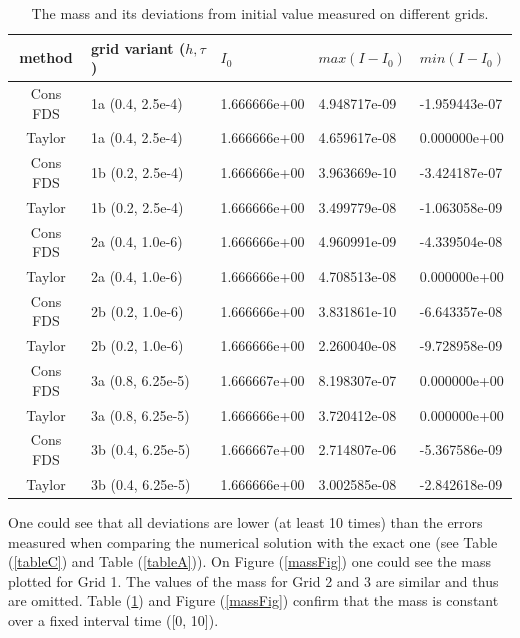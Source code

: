 \documentclass[%
 aip,
cp,  
 amsmath,amssymb,
 reprint,
]{iopconfser}
\newcommand{\rf}[1]{(\ref{#1})}
\begin{document}
\begin{table}[ht]
\centering
\small
		\begin{tabular}{||c|l|l|l|l||}
			\hline
method        & grid variant ($h,\tau$)& $I_0$ &   $max(I-I_0)$ & $min(I-I_0)$  \\
   			\hline 
Cons FDS            &  1a (0.4, 2.5e-4) & 1.666666e+00 &  4.948717e-09 & -1.959443e-07                    \\
 Taylor               &  1a (0.4, 2.5e-4) & 1.666666e+00 &  4.659617e-08 & 0.000000e+00                \\
Cons FDS            &  1b (0.2, 2.5e-4) & 1.666666e+00 & 3.963669e-10 & -3.424187e-07             \\
 Taylor               &  1b (0.2, 2.5e-4) & 1.666666e+00 & 3.499779e-08 & -1.063058e-09               \\
	   		\hline
			\hline
Cons FDS             & 2a (0.4, 1.0e-6) & 1.666666e+00 & 4.960991e-09 & -4.339504e-08                    \\
 Taylor                & 2a (0.4, 1.0e-6) & 1.666666e+00 & 4.708513e-08 & 0.000000e+00                   \\
Cons FDS            & 2b (0.2, 1.0e-6) & 1.666666e+00 & 3.831861e-10 & -6.643357e-08                  \\
 Taylor                & 2b (0.2, 1.0e-6) & 1.666666e+00 & 2.260040e-08 & -9.728958e-09                      \\
	   		\hline
			\hline
Cons FDS           &  3a (0.8, 6.25e-5) & 1.666667e+00 & 8.198307e-07 & 0.000000e+00                    \\
Taylor                &  3a (0.8, 6.25e-5) & 1.666666e+00 &  3.720412e-08 & 0.000000e+00                      \\
Cons FDS           &  3b (0.4, 6.25e-5) & 1.666667e+00 &  2.714807e-06 & -5.367586e-09                     \\
Taylor                &  3b (0.4, 6.25e-5) & 1.666666e+00 &  3.002585e-08 & -2.842618e-09                      \\
			\hline 
			\hline
		\end{tabular}
		\caption{ The mass and its deviations from initial value measured on different grids. }
\label{tableMass}
\end{table}
One could see that all deviations are lower (at least 10 times) than the errors measured when comparing the numerical solution with the exact one (see Table \rf{tableC} and Table \rf{tableA}). On Figure \rf{massFig} one could see the mass plotted for Grid 1. The values of the mass for Grid 2 and 3 are similar and thus are omitted. Table \rf{tableMass} and Figure \rf{massFig} confirm that the mass is constant over a fixed interval time ([0, 10]).
\end{document}
